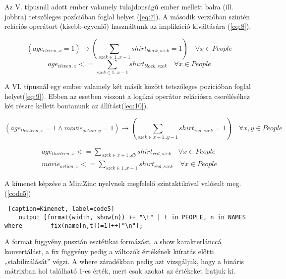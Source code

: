 \documentclass[12pt,a4paper]{report}
\begin{document}
    Az V. típusnál adott ember valamely tulajdonságú ember mellett balra (ill. jobbra) tetszőleges pozícióban foglal helyet (\ref{eq:7}).
    A második verzióban szintén relációs operátort (kisebb-egyenlő) használtunk az implikáció kiváltására (\ref{eq:8}).

    \begin{equation} \label{eq:7}
    (age_{eleven,x}=1) \rightarrow (\sum_{ szek \in 1..x-1 } shirt_{black,szek}=1) \quad \forall x \in People
    \end{equation}
    \begin{equation} \label{eq:8}
    age_{eleven,x} <= \sum_{szek \in 1..x-1} shirt_{black,szek} \quad \forall x \in People
     \end{equation}

    A VI. típusnál egy ember valamely két másik között tetszőleges pozícióban foglal helyet(\ref{eq:9}).
    Ebben az esetben viszont a logikai operátor relációsra cseréléséhez két részre kellett bontanunk az állítást(\ref{eq:10}).

   \begin{equation} \label{eq:9}
    (age_{thirteen,x}=1 \wedge movie_{action,y}=1) \rightarrow (\sum_{szek\in x+1..y-1} shirt_{red,szek}=1) \quad\forall x,y \in People
   \end{equation} 
    
   \begin{equation} \label{eq:10}
   \begin{aligned}
   age_{thirteen,x} <= \sum_{szek\in x+1..db} shirt_{red,szek} \quad \forall x \in People \\
   movie_{action,x} <= \sum_{szek\in 1..x-1} shirt_{red,szek} \quad \forall x \in People
   \end{aligned}
   \end{equation}

    A kimenet képzése a MiniZinc nyelvnek megfelelő szintaktikával valósult meg.(\ref{code5})
    
	\begin{lstlisting} [caption=Kimenet, label=code5]
	output [format(width, show(n)) ++ "\t" | t in PEOPLE, n in NAMES where 		  fix(name[n,t])=1]++["\n"];\end{lstlisting}

    A format függvény pusztán esztétikai formázást, a show karakterlánccá konvertálást, a fix függvény pedig a változók értékének kiíratás előtti „stabilizálását” végzi.
    A where záradékban pedig azt vizsgáljuk, hogy a bináris mátrixban hol található 1-es érték, mert csak azokat az értékeket íratjuk ki.
\end{document}
